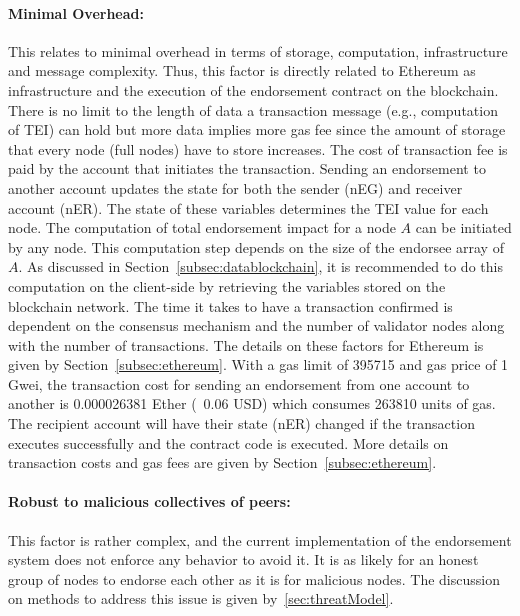\paragraph{Minimal Overhead:}This relates to minimal overhead in terms of
storage, computation, infrastructure and message complexity. Thus, this factor
is directly related to Ethereum as infrastructure and the execution of the
endorsement contract on the blockchain. There is no limit to the length of data
a transaction message (e.g., computation of \ac{TEI}) can hold but more data
implies more gas fee since the amount of storage that every node (full nodes)
have to store increases. The cost of transaction fee is paid by the account
that initiates the transaction. Sending an endorsement to another account
updates the state for both the sender (\ac{nEG}) and receiver account
(\ac{nER}). The state of these variables determines the \ac{TEI} value for each
node. The computation of total endorsement impact for a node $A$ can be
initiated by any node. This computation step depends on the size of the
endorsee array of $A$. As discussed in Section~\ref{subsec:datablockchain}, it
is recommended to do this computation on the client-side by retrieving the
variables stored on the blockchain network. The time it takes to have a
transaction confirmed is dependent on the consensus mechanism and the number of
validator nodes along with the number of transactions. The details on these
factors for Ethereum is given by Section~\ref{subsec:ethereum}. With a gas
limit of 395715 and gas price of 1 Gwei, the transaction cost for sending an
endorsement from one account to another is 0.000026381 Ether (~0.06 USD) which
consumes 263810 units of gas. The recipient account will have their state
(\ac{nER}) changed if the transaction executes successfully and the contract
code is executed. More details on transaction costs and gas fees are given by
Section~\ref{subsec:ethereum}. 
\paragraph{Robust to malicious collectives of peers:}This factor is rather
complex, and the current implementation of the endorsement system does not
enforce any behavior to avoid it. It is as likely for an honest group of nodes
to endorse each other as it is for malicious nodes. The discussion on methods
to address this issue is given by~\ref{sec:threatModel}. 

